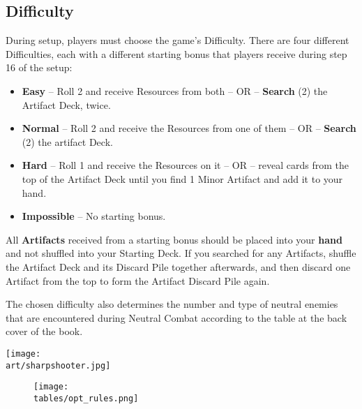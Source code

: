\begin{multicols}{2}

\subsection*{\hypertarget{Difficulty}{Difficulty}}
During setup, players must choose the game's Difficulty.
There are four different Difficulties, each with a different starting bonus that players receive during step 16 of the setup:
\begin{itemize}
  \item \textbf{Easy} – Roll 2  and receive Resources from both – OR – \textbf{Search} (2) the Artifact Deck, twice.
  \item \textbf{Normal} – Roll 2  and receive the Resources from one of them – OR – \textbf{Search} (2) the artifact Deck.
  \item \textbf{Hard} – Roll 1  and receive the Resources on it – OR – reveal cards from the top of the Artifact Deck until you find 1 Minor Artifact and add it to your hand.
  \item \textbf{Impossible} – No starting bonus.
\end{itemize}


All \textbf{Artifacts} received from a starting bonus should be placed into your \textbf{hand} and not shuffled into your Starting Deck.
If you searched for any Artifacts, shuffle the Artifact Deck and its Discard Pile together afterwards, and then discard one Artifact from the top to form the Artifact Discard Pile again.\par
The chosen difficulty also determines the number and type of neutral enemies that are encountered during Neutral Combat according to the table at the back cover of the book.

\end{multicols}

\vfill
\texttt{[image: \\art/sharpshooter.jpg]}

\clearpage

\begin{figure*}[!hb]
  \centering
  \texttt{[image: \\tables/opt\_rules.png]}
\end{figure*}

\vfill
